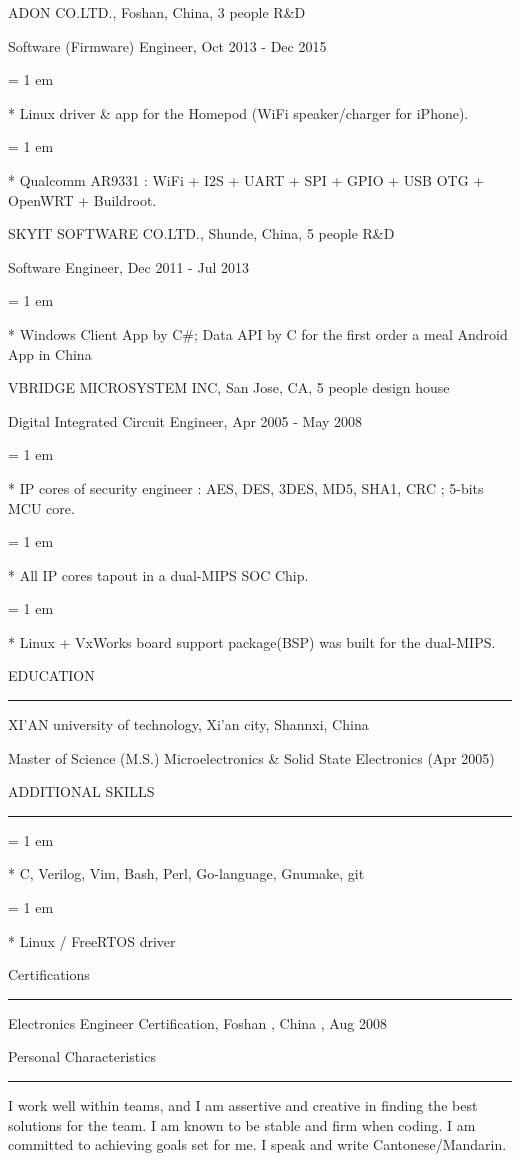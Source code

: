 { \medbreak } { \FFbg
ADON CO.LTD., Foshan, China, 3 people R\&D
}

{ \FFte
Software (Firmware) Engineer, Oct 2013 - Dec 2015
}
{ \parindent = 1 em \item{*}
 Linux driver \& app for the Homepod (WiFi speaker/charger for iPhone). 
}
{ \parindent = 1 em \item{*}
 Qualcomm AR9331 : WiFi + I2S + UART + SPI + GPIO + USB OTG + OpenWRT + Buildroot.
 }

{ \medbreak } { \FFbg
SKYIT SOFTWARE CO.LTD., Shunde, China, 5 people R\&D
}

{ \FFte
Software Engineer, Dec 2011 - Jul 2013
}
{ \parindent = 1 em \item{*}
 Windows Client App by C\#; Data API by C for the first order a meal Android App in China
 }

{ \medbreak } { \FFbg
VBRIDGE MICROSYSTEM INC, San Jose, CA, 5 people design house
}

{ \FFte
Digital Integrated Circuit Engineer, Apr 2005 - May 2008
}
{ \parindent = 1 em \item{*}
 IP cores of security engineer :
 AES, DES, 3DES, MD5, SHA1, CRC ;
 5-bits MCU core.
 }
{ \parindent = 1 em \item{*}
All IP cores tapout in a dual-MIPS SOC Chip.
 }
{ \parindent = 1 em \item{*}
Linux + VxWorks board support package(BSP) was built for the dual-MIPS.
 }

{ \medbreak } { \FFbg
EDUCATION
}
{ \smallbreak } {\par\noindent\hrule} { \smallbreak }
XI'AN university of technology, Xi'an city, Shannxi, China

{ \FFte
Master of Science (M.S.) Microelectronics \& Solid State Electronics (Apr 2005)
}

{ \medbreak } { \FFbg
ADDITIONAL SKILLS
}
{ \smallbreak } {\par\noindent\hrule} { \smallbreak }
{ \parindent = 1 em \item{*}
 C, Verilog, Vim, Bash, Perl, Go-language, Gnumake, git
 }
{ \parindent = 1 em \item{*}
 Linux / FreeRTOS driver
 }

{ \medbreak } { \FFbg
Certifications
}
{ \smallbreak } {\par\noindent\hrule} { \smallbreak }
Electronics Engineer Certification, Foshan , China , Aug 2008

{ \medbreak } { \FFbg
Personal Characteristics
}
{ \smallbreak } {\par\noindent\hrule} { \smallbreak }
I work well within teams, and I am assertive and creative
    in finding the best solutions for the team.
I am known to be stable and firm when coding.
I am committed to achieving goals set for me.
I speak and write
Cantonese/Mandarin.

